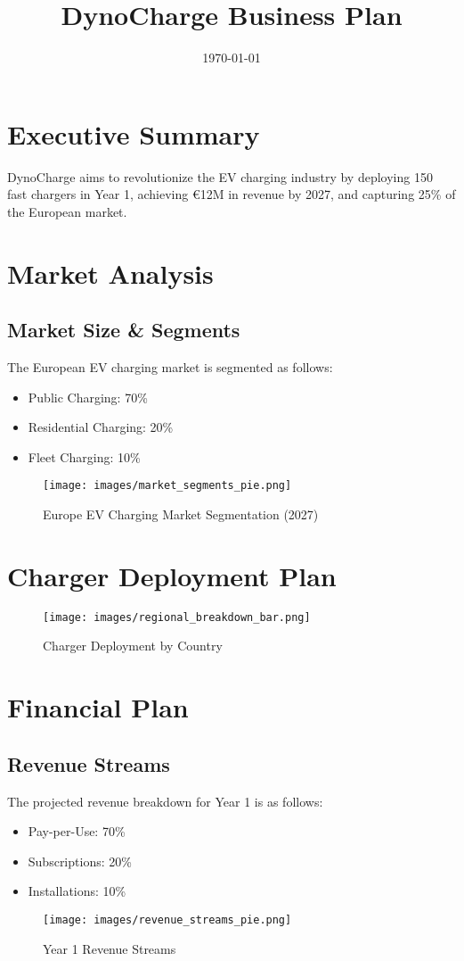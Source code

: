 \documentclass[11pt,a4paper]{article}
\title{DynoCharge Business Plan}
\author{}
\date{\today}
\begin{document}
\maketitle
\tableofcontents
\newpage

\section{Executive Summary}
DynoCharge aims to revolutionize the EV charging industry by deploying 150 fast chargers in Year 1, achieving €12M in revenue by 2027, and capturing 25\% of the European market.

\section{Market Analysis}
\subsection{Market Size \& Segments}
The European EV charging market is segmented as follows:
\begin{itemize}
    \item Public Charging: 70\%
    \item Residential Charging: 20\%
    \item Fleet Charging: 10\%
\end{itemize}
\begin{figure}[h]
\centering
\texttt{[image: images/market\_segments\_pie.png]}
\caption{Europe EV Charging Market Segmentation (2027)}
\end{figure}

\section{Charger Deployment Plan}
\begin{figure}[h]
\centering
\texttt{[image: images/regional\_breakdown\_bar.png]}
\caption{Charger Deployment by Country}
\end{figure}

\section{Financial Plan}
\subsection{Revenue Streams}
The projected revenue breakdown for Year 1 is as follows:
\begin{itemize}
    \item Pay-per-Use: 70\%
    \item Subscriptions: 20\%
    \item Installations: 10\%
\end{itemize}
\begin{figure}[h]
\centering
\texttt{[image: images/revenue\_streams\_pie.png]}
\caption{Year 1 Revenue Streams}
\end{figure}
\end{document}
